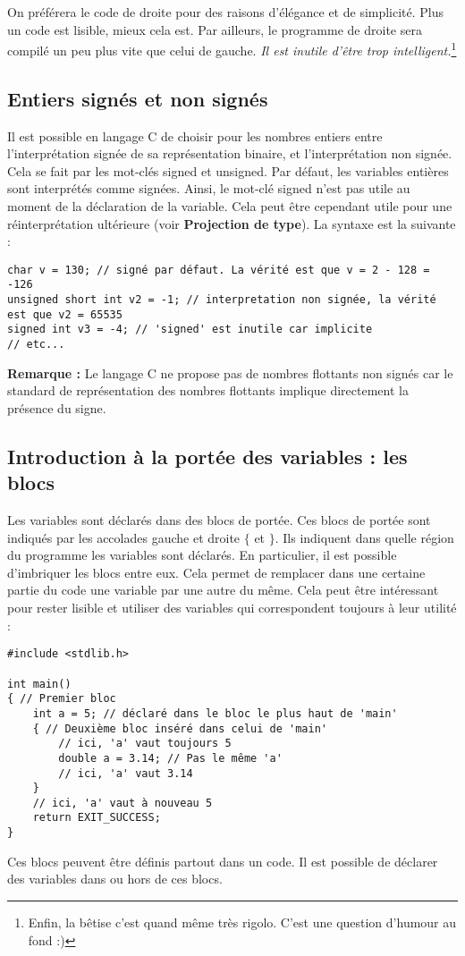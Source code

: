 \documentclass[../../../main.tex]{subfiles}
\begin{document}
On préférera le code de droite pour des raisons d'élégance et de simplicité. Plus un code est lisible, mieux cela est. Par ailleurs, le programme de droite sera compilé un peu plus vite que celui de gauche. \textit{Il est inutile d'être trop intelligent.}\footnote{Enfin, la bêtise c'est quand même très rigolo. C'est une question d'humour au fond :)}
\subsection{Entiers signés et non signés}
Il est possible en langage C de choisir pour les nombres entiers entre l'interprétation signée de sa représentation binaire, et l'interprétation non signée. Cela se fait par les mot-clés \textsf{signed} et \textsf{unsigned}. Par défaut, les variables entières sont interprétés comme signées. Ainsi, le mot-clé \textsf{signed} n'est pas utile au moment de la déclaration de la variable. Cela peut être cependant utile pour une réinterprétation ultérieure (voir \textbf{Projection de type}). La syntaxe est la suivante :
\begin{verbatim}
char v = 130; // signé par défaut. La vérité est que v = 2 - 128 = -126
unsigned short int v2 = -1; // interpretation non signée, la vérité est que v2 = 65535
signed int v3 = -4; // 'signed' est inutile car implicite
// etc...
\end{verbatim}
\textbf{Remarque :} Le langage C ne propose pas de nombres flottants non signés car le standard de représentation des nombres flottants implique directement la présence du signe.

\subsection{Introduction à la portée des variables : les blocs}
Les variables sont déclarés dans des blocs de portée. Ces blocs de portée sont indiqués par les accolades gauche et droite $\{$ et $\}$. Ils indiquent dans quelle région du programme les variables sont déclarés. En particulier, il est possible d'imbriquer les blocs entre eux. Cela permet de remplacer dans une certaine partie du code une variable par une autre du même. Cela peut être intéressant pour rester lisible et utiliser des variables qui correspondent toujours à leur utilité :
\begin{verbatim}
#include <stdlib.h>

int main()
{ // Premier bloc
	int a = 5; // déclaré dans le bloc le plus haut de 'main'
	{ // Deuxième bloc inséré dans celui de 'main'
		// ici, 'a' vaut toujours 5
		double a = 3.14; // Pas le même 'a'
		// ici, 'a' vaut 3.14
	}
	// ici, 'a' vaut à nouveau 5
	return EXIT_SUCCESS;
}
\end{verbatim}
Ces blocs peuvent être définis partout dans un code. Il est possible de déclarer des variables dans ou hors de ces blocs.
 
\end{document}
